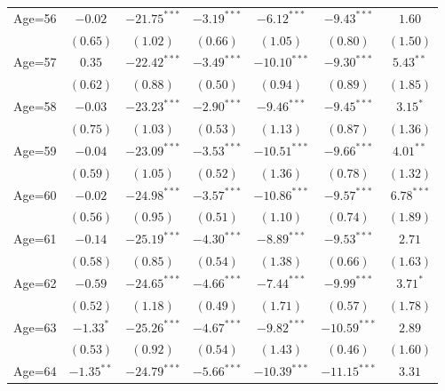 \documentclass[fullpage]{paper}
\begin{document}
\begin{center}
\begin{longtable}{l c c c c c c }
Age=56      & $-0.02$       & $-21.75^{***}$ & $-3.19^{***}$ & $-6.12^{***}$  & $-9.43^{***}$  & $1.60$        \\
            & $(0.65)$      & $(1.02)$       & $(0.66)$      & $(1.05)$       & $(0.80)$       & $(1.50)$      \\
Age=57      & $0.35$        & $-22.42^{***}$ & $-3.49^{***}$ & $-10.10^{***}$ & $-9.30^{***}$  & $5.43^{**}$   \\
            & $(0.62)$      & $(0.88)$       & $(0.50)$      & $(0.94)$       & $(0.89)$       & $(1.85)$      \\
Age=58      & $-0.03$       & $-23.23^{***}$ & $-2.90^{***}$ & $-9.46^{***}$  & $-9.45^{***}$  & $3.15^{*}$    \\
            & $(0.75)$      & $(1.03)$       & $(0.53)$      & $(1.13)$       & $(0.87)$       & $(1.36)$      \\
Age=59      & $-0.04$       & $-23.09^{***}$ & $-3.53^{***}$ & $-10.51^{***}$ & $-9.66^{***}$  & $4.01^{**}$   \\
            & $(0.59)$      & $(1.05)$       & $(0.52)$      & $(1.36)$       & $(0.78)$       & $(1.32)$      \\
Age=60      & $-0.02$       & $-24.98^{***}$ & $-3.57^{***}$ & $-10.86^{***}$ & $-9.57^{***}$  & $6.78^{***}$  \\
            & $(0.56)$      & $(0.95)$       & $(0.51)$      & $(1.10)$       & $(0.74)$       & $(1.89)$      \\
Age=61      & $-0.14$       & $-25.19^{***}$ & $-4.30^{***}$ & $-8.89^{***}$  & $-9.53^{***}$  & $2.71$        \\
            & $(0.58)$      & $(0.85)$       & $(0.54)$      & $(1.38)$       & $(0.66)$       & $(1.63)$      \\
Age=62      & $-0.59$       & $-24.65^{***}$ & $-4.66^{***}$ & $-7.44^{***}$  & $-9.99^{***}$  & $3.71^{*}$    \\
            & $(0.52)$      & $(1.18)$       & $(0.49)$      & $(1.71)$       & $(0.57)$       & $(1.78)$      \\
Age=63      & $-1.33^{*}$   & $-25.26^{***}$ & $-4.67^{***}$ & $-9.82^{***}$  & $-10.59^{***}$ & $2.89$        \\
            & $(0.53)$      & $(0.92)$       & $(0.54)$      & $(1.43)$       & $(0.46)$       & $(1.60)$      \\
Age=64      & $-1.35^{**}$  & $-24.79^{***}$ & $-5.66^{***}$ & $-10.39^{***}$ & $-11.15^{***}$ & $3.31$        \\

\end{longtable}
\end{center}
\end{document}
